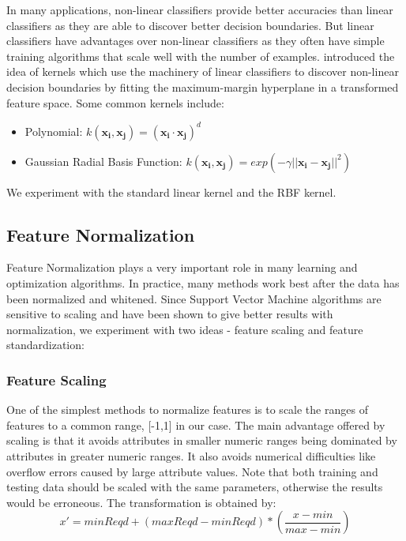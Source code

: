 In many applications, non-linear classifiers provide better accuracies than linear classifiers as they are able to discover better decision boundaries. But linear classifiers have advantages over non-linear classifiers as they often have simple training algorithms that scale well with the number of examples. \citep{VapnikSVMKernel:92} introduced the idea of kernels which use the machinery of linear classifiers to discover non-linear decision boundaries by fitting the maximum-margin hyperplane in a transformed feature space. Some common kernels include:
\begin{itemize}
\item Polynomial: $k(\bm{x_i},\bm{x_j}) = (\bm{x_i \cdot x_j})^d$
\item Gaussian Radial Basis Function: $k(\bm{x_i},\bm{x_j}) = exp(-\gamma||\bm{x_i - x_j}||^2)$
\end{itemize}
We experiment with the standard linear kernel and the RBF kernel.

\subsection{Feature Normalization}
Feature Normalization plays a very important role in many learning and optimization algorithms. In practice, many methods work best after the data has been normalized and whitened. Since Support Vector Machine algorithms are sensitive to scaling and have been shown to give better results with normalization, we experiment with two ideas - feature scaling and feature standardization:

\subsubsection{Feature Scaling}
One of the simplest methods to normalize features is to scale the ranges of features to a common range, [-1,1] in our case. The main advantage offered by scaling is that it avoids attributes in smaller numeric ranges being dominated by attributes in greater numeric ranges. It also avoids numerical difficulties like overflow errors caused by large attribute values. Note that both training and testing data should be scaled with the same parameters, otherwise the results would be erroneous. The transformation is obtained by:
\begin{equation}
\label{eq:FeatureScaling}
x' = minReqd + (maxReqd-minReqd)*\left(\frac{x-min}{max-min}\right)
\end{equation}

